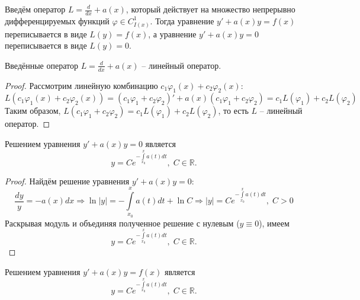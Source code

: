 Введём оператор $L = \frac{d}{dx} + a(x)$, который действует на множество непрерывно дифференцируемых функций $\varphi \in C^1_{I(x)}$. Тогда уравнение $y' + a(x) y = f(x)$ переписывается в виде $L(y) = f(x)$, а уравнение $y' + a(x) y = 0$ переписывается в виде $L(y) = 0$.

\begin{theorem}
    Введённые оператор $L = \frac{d}{dx} + a(x)$ -- линейный оператор.
\end{theorem}

\begin{proof}
    Рассмотрим линейную комбинацию $c_1 \varphi_1(x) + c_2 \varphi_2(x)$:
    \begin{equation}
        L(c_1 \varphi_1(x) + c_2 \varphi_2(x)) = (c_1 \varphi_1 + c_2 \varphi_2)' + a(x) (c_1 \varphi_1 + c_2 \varphi_2) = c_1 L(\varphi_1) + c_2 L(\varphi_2)
    \end{equation}
    Таким образом, $L(c_1 \varphi_1 + c_2 \varphi_2) = c_1 L(\varphi_1) + c_2 L(\varphi_2)$, то есть $L$ -- линейный оператор.
\end{proof}

\begin{proposition}
    Решением уравнения $y' + a(x) y = 0$ является
    \begin{equation}
        y = C e^{-\int\limits_{x_0}^{x} a(t) dt}, \; C \in \mathbb{R}.
    \end{equation}
\end{proposition}

\begin{proof}
    Найдём решение уравнения $y' + a(x) y = 0$: 
    \begin{equation}
        \frac{dy}{y} = -a(x) dx \Rightarrow \ln |y| = - \int\limits_{x_0}^{x} a(t) dt + \ln C \Rightarrow |y| = C e^{-\int\limits_{x_0}^{x} a(t) dt}, \; C > 0
    \end{equation}
    Раскрывая модуль и объединяя полученное решение с нулевым ($y \equiv 0$), имеем
    \begin{equation}
        y = C e^{-\int\limits_{x_0}^{x} a(t) dt}, \; C \in \mathbb{R}.
    \end{equation}
\end{proof}

\begin{proposition}
    Решением уравнения $y' + a(x) y = f(x)$ является
    \begin{equation}
        y = C e^{-\int\limits_{x_0}^{x} a(t) dt}, \; C \in \mathbb{R}.
    \end{equation}
\end{proposition}

